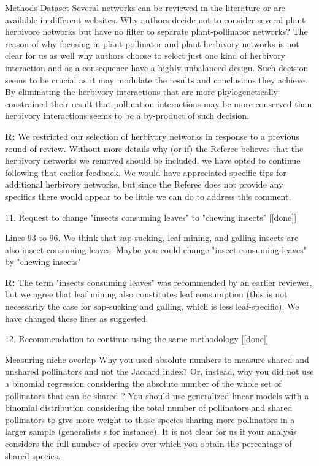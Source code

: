 \documentclass[12pt]{letter}
\newenvironment{refquote}{\bigskip \begin{it}}{\end{it}\smallskip}
\begin{document}
		\begin{refquote}
		Methods
		Dataset
		Several networks can be reviewed in the literature or are available in different websites. Why authors decide not to consider several plant-herbivore networks but have no filter to separate plant-pollinator networks? The reason of why focusing in plant-pollinator and plant-herbivory networks is not clear for us as well why authors choose to select just one kind of herbivory interaction and as a consequence have a highly unbalanced design. Such decision seems to be crucial as it may modulate the results and conclusions they achieve. By eliminating the herbivory interactions that are more phylogenetically constrained their result that pollination interactions may be more conserved than herbivory interactions seems to be a by-product of such decision.
		\end{refquote}


		\textbf{R:} We restricted our selection of herbivory networks in response to a previous round of review. Without more details why (or if) the Referee believes that the herbivory networks we removed should be included, we have opted to continue following that earlier feedback. We would have appreciated specific tips for additional herbivory networks, but since the Referee does not provide any specifics there would appear to be little we can do to address this comment.


	11. Request to change "insects consuming leaves" to "chewing insects" [[done]]

		\begin{refquote}
			Lines 93 to 96. We think that sap-sucking, leaf mining, and galling insects are also insect consuming leaves. Maybe you could change "insect consuming leaves" by "chewing insects"
		\end{refquote}

		\textbf{R:} The term "insects consuming leaves" was recommended by an earlier reviewer, but we agree that leaf mining also constitutes leaf consumption (this is not necessarily the case for sap-sucking and galling, which is less leaf-specific). We have changed these lines as suggested.


	12. Recommendation to continue using the same methodology [[done]]

		\begin{refquote}
			Measuring niche overlap
			Why you used absolute numbers to measure shared and unshared pollinators and not the Jaccard index? Or, instead, why you did not use a binomial regression considering the absolute number of the whole set of pollinators that can be shared ? You should use generalized linear models with a binomial distribution considering the total number of pollinators and shared pollinators to give more weight to those species sharing more pollinators in a larger sample (generalists s for instance). It is not clear for us if your analysis considers the full number of species over which you obtain the percentage of shared species.
		\end{refquote}
\end{document}
